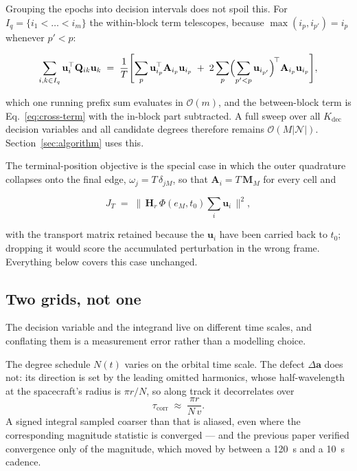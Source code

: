 Grouping the epochs into decision intervals does not spoil this. For
$I_q=\{i_1<\dots<i_m\}$ the within-block term telescopes, because
$\max(i_p,i_{p'})=i_{p}$ whenever $p'<p$:

\begin{equation}
  \sum_{i,k\in I_q}\mathbf u_i^{\top}\mathbf Q_{ik}\mathbf u_k
  \;=\;
  \frac{1}{T}\Biggl[
  \sum_{p}\mathbf u_{i_p}^{\top}\mathbf A_{i_p}\mathbf u_{i_p}
  \;+\; 2\sum_{p}\Bigl(\sum_{p'<p}\mathbf u_{i_{p'}}\Bigr)^{\!\top}
  \mathbf A_{i_p}\mathbf u_{i_p}\Biggr] ,
  \label{eq:within-block}
\end{equation}

which one running prefix sum evaluates in $\mathcal{O}(m)$, and the
between-block term is Eq.~\eqref{eq:cross-term} with the in-block part
subtracted. A full sweep over all $K_{\mathrm{dec}}$ decision variables and all
candidate degrees therefore remains
$\mathcal{O}(M\lvert\mathcal{N}\rvert)$. Section~\ref{sec:algorithm} uses this.

The terminal-position objective is the special case in which the outer
quadrature collapses onto the final edge, $\omega_j = T\,\delta_{jM}$, so that
$\mathbf A_i = T\,\mathbf M_M$ for every cell and

\begin{equation}
  J_T \;=\; \bigl\lVert\,\mathbf H_r\,\Phi(e_M,t_0)\textstyle\sum_i\mathbf u_i
  \,\bigr\rVert^2 ,
  \label{eq:terminal}
\end{equation}

with the transport matrix retained because the $\mathbf u_i$ have been carried
back to $t_0$; dropping it would score the accumulated perturbation in the
wrong frame. Everything below covers this case unchanged.

\subsection{Two grids, not one}
\label{sec:problem-grids}

The decision variable and the integrand live on different time scales, and
conflating them is a measurement error rather than a modelling choice.

The degree schedule $N(t)$ varies on the orbital time scale. The defect
$\Delta\mathbf a$ does not: its direction is set by the leading omitted
harmonics, whose half-wavelength at the spacecraft's radius is $\pi r/N$, so
along track it decorrelates over
\begin{equation}
  \tau_{\mathrm{corr}} \;\approx\; \frac{\pi r}{N\,v} .
  \label{eq:decorrelation}
\end{equation}
A signed integral sampled coarser than that is aliased, even where the
corresponding magnitude statistic is converged --- and the previous paper
verified convergence only of the magnitude, which moved by  between a
120~s and a 10~s cadence.

